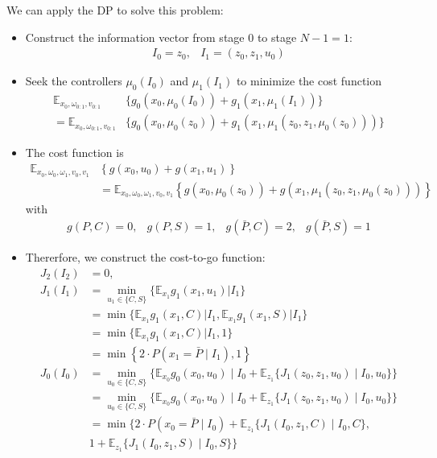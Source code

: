 We can apply the DP to solve this problem:
\begin{itemize}
\item
Construct the information vector from stage $0$ to stage $N-1=1$:
\[
\begin{array}{ll}
I_0=z_0,&
I_1=(z_0,z_1,u_0)
\end{array}
\]
\item
Seek the controllers $\mu_0(I_0)$ and $\mu_1(I_1)$ to minimize the cost function
\begin{align*}
\mathbb{E}_{x_0,\omega_{0:1},v_{0:1}}
&\Bigg\{
g_0(x_0,\mu_0(I_0))
+
g_1(x_1,\mu_1(I_1))
\Bigg\}\\
=
\mathbb{E}_{x_0,\omega_{0:1},v_{0:1}}
&\Bigg\{
g_0(x_0,\mu_0(z_0))
+
g_1(x_1,\mu_1(z_0,z_1,\mu_0(z_0)))
\Bigg\}
\end{align*}
\item





The cost function is
\begin{align*}
\mathbb{E}_{x_0,\omega_0,\omega_1,v_0,v_1}&
\left\{
g(x_0,u_0)+g(x_1,u_1)
\right\}
\\&=
\mathbb{E}_{x_0,\omega_0,\omega_1,v_0,v_1}
\left\{
g(x_0,\mu_0(z_0))+g(x_1,\mu_1(z_0,z_1,\mu_0(z_0)))
\right\}
\end{align*}
with
\[
\begin{array}{llll}
g(P,C)=0,&g(P,S)=1,&g(\bar{P},C)=2,&g(\bar{P},S)=1
\end{array}
\]
\item
Thererfore, we construct the cost-to-go function:
\begin{align*}
J_2(I_2)&=0,\\
J_1(I_1)&=\min_{u_{1}\in\{C,S\}}
\Bigg\{
\mathbb{E}_{x_1}g_1(x_1,u_1)\Bigg| I_{1}
\Bigg\}\\
&=\min
\Bigg\{
\mathbb{E}_{x_1}g_1(x_1,C)\Bigg| I_1,
\mathbb{E}_{x_1}g_1(x_1,S)\Bigg| I_1
\Bigg\}\\
&=
\min
\Bigg\{
\mathbb{E}_{x_1}g_1(x_1,C)\Bigg| I_1,
1
\Bigg\}\\
&=\min
\left\{
2\cdot P(x_1=\bar{P}\mid I_1),
1
\right\}\\
J_0(I_0)&=
\min_{u_0\in\{C,S\}}
\Bigg\{
\mathbb{E}_{x_0}g_0(x_0,u_0)\mid I_0+
\mathbb{E}_{z_1}\{J_1(z_0,z_1,u_0)\mid I_0,u_0\}
\Bigg\}\\
&=
\min_{u_0\in\{C,S\}}
\Bigg\{
\mathbb{E}_{x_0}g_0(x_0,u_0)\mid I_0+
\mathbb{E}_{z_1}\{J_1(z_0,z_1,u_0)\mid I_0,u_0\}
\Bigg\}\\
&=\min
\Bigg\{
2\cdot P(x_0=\bar{P}\mid I_0)+\mathbb{E}_{z_1}\{J_1(I_0,z_1,C)\mid I_0,C\},\\
&
1+\mathbb{E}_{z_1}\{J_1(I_0,z_1,S)\mid I_0,S\}
\Bigg\}
\end{align*}

\end{itemize}
